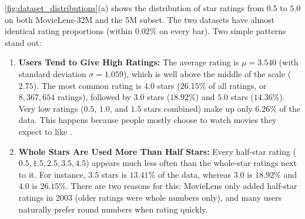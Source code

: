 \documentclass{article}
\theoremstyle{plain}
\theoremstyle{definition}
\begin{document}
\cref{fig:dataset_distributions}(a) shows the distribution of star ratings from $0.5$ to $5.0$ on both MovieLens-32M and the 5M subset. The two datasets have almost identical rating proportions (within $0.02\%$ on every bar). Two simple patterns stand out:
\begin{enumerate}
    \item \textbf{Users Tend to Give High Ratings:} The average rating is $\mu = 3.540$ (with standard deviation $\sigma = 1.059$), which is well above the middle of the scale ($2.75$). The most common rating is $4.0$ stars ($26.15\%$ of all ratings, or $8{,}367{,}654$ ratings), followed by $3.0$ stars ($18.92\%$) and $5.0$ stars ($14.36\%$). Very low ratings ($0.5$, $1.0$, and $1.5$ stars combined) make up only $6.26\%$ of the data. This happens because people mostly choose to watch movies they expect to like \cite{koren2009matrix}.
    \item \textbf{Whole Stars Are Used More Than Half Stars:} Every half-star rating ($0.5, 1.5, 2.5, 3.5, 4.5$) appears much less often than the whole-star ratings next to it. For instance, $3.5$ stars is $13.41\%$ of the data, whereas $3.0$ is $18.92\%$ and $4.0$ is $26.15\%$. There are two reasons for this: MovieLens only added half-star ratings in 2003 (older ratings were whole numbers only), and many users naturally prefer round numbers when rating quickly.
\end{enumerate}
\end{document}
